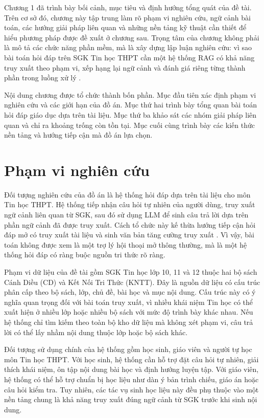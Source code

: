 \documentclass[../DoAn.tex]{subfiles}
\begin{document}
Chương 1 đã trình bày bối cảnh, mục tiêu và định hướng tổng quát của đề tài. Trên cơ sở đó, chương này tập trung làm rõ phạm vi nghiên cứu, ngữ cảnh bài toán, các hướng giải pháp liên quan và những nền tảng kỹ thuật cần thiết để hiểu phương pháp được đề xuất ở chương sau. Trọng tâm của chương không phải là mô tả các chức năng phần mềm, mà là xây dựng lập luận nghiên cứu: vì sao bài toán hỏi đáp trên SGK Tin học THPT cần một hệ thống RAG có khả năng truy xuất theo phạm vi, xếp hạng lại ngữ cảnh và đánh giá riêng từng thành phần trong luồng xử lý \cite{lewis2020rag}.

Nội dung chương được tổ chức thành bốn phần. Mục đầu tiên xác định phạm vi nghiên cứu và các giới hạn của đồ án. Mục thứ hai trình bày tổng quan bài toán hỏi đáp giáo dục dựa trên tài liệu. Mục thứ ba khảo sát các nhóm giải pháp liên quan và chỉ ra khoảng trống còn tồn tại. Mục cuối cùng trình bày các kiến thức nền tảng và hướng tiếp cận mà đồ án lựa chọn.

\section{Phạm vi nghiên cứu}

Đối tượng nghiên cứu của đồ án là hệ thống hỏi đáp dựa trên tài liệu cho môn Tin học THPT. Hệ thống tiếp nhận câu hỏi tự nhiên của người dùng, truy xuất ngữ cảnh liên quan từ SGK, sau đó sử dụng LLM để sinh câu trả lời dựa trên phần ngữ cảnh đã được truy xuất. Cách tổ chức này kế thừa hướng tiếp cận hỏi đáp mở có truy xuất tài liệu và sinh văn bản tăng cường truy xuất \cite{karpukhin2020dpr,lewis2020rag}. Vì vậy, bài toán không được xem là một trợ lý hội thoại mở thông thường, mà là một hệ thống hỏi đáp có ràng buộc nguồn tri thức rõ ràng.

Phạm vi dữ liệu của đề tài gồm SGK Tin học lớp 10, 11 và 12 thuộc hai bộ sách Cánh Diều (CD) và Kết Nối Tri Thức (KNTT). Đây là nguồn dữ liệu có cấu trúc phân cấp theo bộ sách, lớp, chủ đề, bài học và mục nội dung. Cấu trúc này có ý nghĩa quan trọng đối với bài toán truy xuất, vì nhiều khái niệm Tin học có thể xuất hiện ở nhiều lớp hoặc nhiều bộ sách với mức độ trình bày khác nhau. Nếu hệ thống chỉ tìm kiếm theo toàn bộ kho dữ liệu mà không xét phạm vi, câu trả lời có thể lấy nhầm nội dung thuộc lớp hoặc bộ sách khác.

Đối tượng sử dụng chính của hệ thống gồm học sinh, giáo viên và người tự học môn Tin học THPT. Với học sinh, hệ thống cần hỗ trợ đặt câu hỏi tự nhiên, giải thích khái niệm, ôn tập nội dung bài học và định hướng luyện tập. Với giáo viên, hệ thống có thể hỗ trợ chuẩn bị học liệu như dàn ý bản trình chiếu, giáo án hoặc câu hỏi kiểm tra. Tuy nhiên, các tác vụ sinh học liệu này đều phụ thuộc vào một nền tảng chung là khả năng truy xuất đúng ngữ cảnh từ SGK trước khi sinh nội dung.
\end{document}
